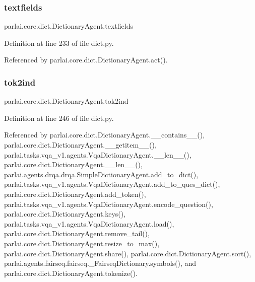 \mbox{\label{classparlai_1_1core_1_1dict_1_1DictionaryAgent_a771c6e70dd433cdc076fd1261f2f3845}} 
\subsubsection{\texorpdfstring{textfields}{textfields}}
{\footnotesize\ttfamily parlai.\+core.\+dict.\+Dictionary\+Agent.\+textfields}



Definition at line 233 of file dict.\+py.



Referenced by parlai.\+core.\+dict.\+Dictionary\+Agent.\+act().

\mbox{\label{classparlai_1_1core_1_1dict_1_1DictionaryAgent_a5955a6e5b031b8540694b847a9889bcd}} 
\subsubsection{\texorpdfstring{tok2ind}{tok2ind}}
{\footnotesize\ttfamily parlai.\+core.\+dict.\+Dictionary\+Agent.\+tok2ind}



Definition at line 246 of file dict.\+py.



Referenced by parlai.\+core.\+dict.\+Dictionary\+Agent.\+\_\+\+\_\+contains\+\_\+\+\_\+(), parlai.\+core.\+dict.\+Dictionary\+Agent.\+\_\+\+\_\+getitem\+\_\+\+\_\+(), parlai.\+tasks.\+vqa\+\_\+v1.\+agents.\+Vqa\+Dictionary\+Agent.\+\_\+\+\_\+len\+\_\+\+\_\+(), parlai.\+core.\+dict.\+Dictionary\+Agent.\+\_\+\+\_\+len\+\_\+\+\_\+(), parlai.\+agents.\+drqa.\+drqa.\+Simple\+Dictionary\+Agent.\+add\+\_\+to\+\_\+dict(), parlai.\+tasks.\+vqa\+\_\+v1.\+agents.\+Vqa\+Dictionary\+Agent.\+add\+\_\+to\+\_\+ques\+\_\+dict(), parlai.\+core.\+dict.\+Dictionary\+Agent.\+add\+\_\+token(), parlai.\+tasks.\+vqa\+\_\+v1.\+agents.\+Vqa\+Dictionary\+Agent.\+encode\+\_\+question(), parlai.\+core.\+dict.\+Dictionary\+Agent.\+keys(), parlai.\+tasks.\+vqa\+\_\+v1.\+agents.\+Vqa\+Dictionary\+Agent.\+load(), parlai.\+core.\+dict.\+Dictionary\+Agent.\+remove\+\_\+tail(), parlai.\+core.\+dict.\+Dictionary\+Agent.\+resize\+\_\+to\+\_\+max(), parlai.\+core.\+dict.\+Dictionary\+Agent.\+share(), parlai.\+core.\+dict.\+Dictionary\+Agent.\+sort(), parlai.\+agents.\+fairseq.\+fairseq.\+\_\+\+Fairseq\+Dictionary.\+symbols(), and parlai.\+core.\+dict.\+Dictionary\+Agent.\+tokenize().

